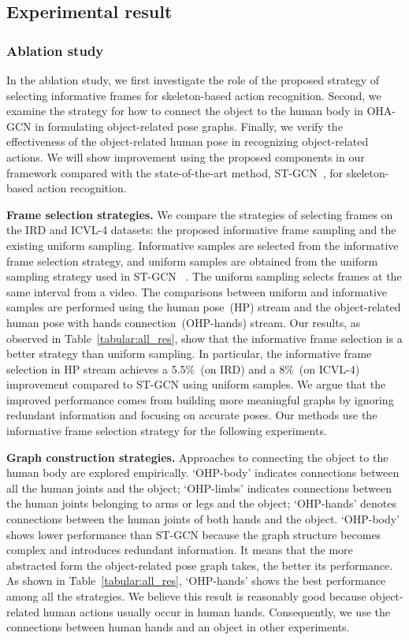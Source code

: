 \documentclass[10pt,twocolumn,letterpaper]{article}
\begin{document}
\subsection{Experimental result}
\subsubsection{Ablation study}
\label{sec:ablation}
\quad In the ablation study, we first investigate the role of 
the proposed strategy of selecting informative frames for skeleton-based action recognition. Second, we examine the strategy for how to connect the object to the human body in OHA-GCN in formulating object-related pose graphs.
Finally, we verify the effectiveness of the object-related human pose in recognizing object-related actions. 
We will show improvement using the proposed components in our framework compared with the state-of-the-art method, ST-GCN~\cite{stgcn2018aaai}, for skeleton-based action recognition.

\textbf{Frame selection strategies.} 
We compare the strategies of selecting frames on the IRD and ICVL-4 datasets: the proposed informative frame sampling and the existing uniform sampling.
Informative samples are selected from the informative frame selection strategy, and uniform samples are obtained from the uniform sampling strategy used in ST-GCN ~\cite{stgcn2018aaai}.
The uniform sampling selects  frames at the same interval from a video.
The comparisons between uniform and informative samples are performed using the human pose~(HP) stream and the object-related human pose with hands connection~(OHP-hands) stream.
Our results, as observed in Table~\ref{tabular:all_res}, show that the informative frame selection is a better strategy than uniform sampling. 
In particular, the informative frame selection in HP stream achieves a 5.5\%~(on IRD) and a 8\%~(on ICVL-4)  improvement compared to ST-GCN using uniform samples.
We argue that the improved performance comes from building more meaningful graphs by ignoring redundant information and focusing on accurate poses.
Our methods use the informative frame selection strategy for the following experiments.

\textbf{Graph construction strategies.} 
Approaches to connecting the object to the human body are explored empirically. `OHP-body' indicates connections between all the human joints and the object; `OHP-limbs' indicates connections between the human joints belonging to arms or legs and the object; `OHP-hands' denotes connections between the human joints of both hands and the object.
`OHP-body' shows lower performance than ST-GCN because the graph structure becomes complex and introduces redundant information.
It means that the more abstracted form the object-related pose graph takes, the better its performance.
As shown in Table~\ref{tabular:all_res}, `OHP-hands' shows the best performance among all the strategies.
We believe this result is reasonably good because object-related human actions usually occur in human hands. 
Consequently, we use the connections between human hands and an object in other experiments.
\end{document}

